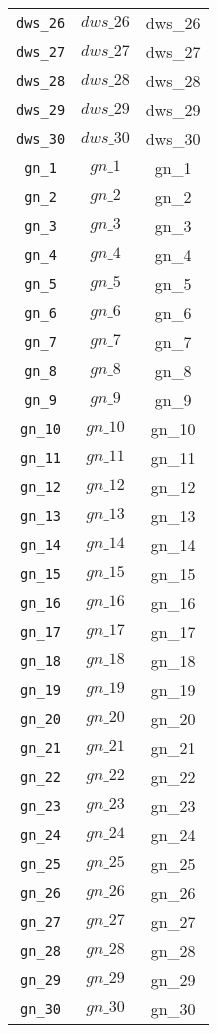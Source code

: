\begin{center}
\begin{longtable}{ccc}
\texttt{dws\_26} & $dws\_26$ & dws\_26\\
\texttt{dws\_27} & $dws\_27$ & dws\_27\\
\texttt{dws\_28} & $dws\_28$ & dws\_28\\
\texttt{dws\_29} & $dws\_29$ & dws\_29\\
\texttt{dws\_30} & $dws\_30$ & dws\_30\\
\texttt{gn\_1} & $gn\_1$ & gn\_1\\
\texttt{gn\_2} & $gn\_2$ & gn\_2\\
\texttt{gn\_3} & $gn\_3$ & gn\_3\\
\texttt{gn\_4} & $gn\_4$ & gn\_4\\
\texttt{gn\_5} & $gn\_5$ & gn\_5\\
\texttt{gn\_6} & $gn\_6$ & gn\_6\\
\texttt{gn\_7} & $gn\_7$ & gn\_7\\
\texttt{gn\_8} & $gn\_8$ & gn\_8\\
\texttt{gn\_9} & $gn\_9$ & gn\_9\\
\texttt{gn\_10} & $gn\_10$ & gn\_10\\
\texttt{gn\_11} & $gn\_11$ & gn\_11\\
\texttt{gn\_12} & $gn\_12$ & gn\_12\\
\texttt{gn\_13} & $gn\_13$ & gn\_13\\
\texttt{gn\_14} & $gn\_14$ & gn\_14\\
\texttt{gn\_15} & $gn\_15$ & gn\_15\\
\texttt{gn\_16} & $gn\_16$ & gn\_16\\
\texttt{gn\_17} & $gn\_17$ & gn\_17\\
\texttt{gn\_18} & $gn\_18$ & gn\_18\\
\texttt{gn\_19} & $gn\_19$ & gn\_19\\
\texttt{gn\_20} & $gn\_20$ & gn\_20\\
\texttt{gn\_21} & $gn\_21$ & gn\_21\\
\texttt{gn\_22} & $gn\_22$ & gn\_22\\
\texttt{gn\_23} & $gn\_23$ & gn\_23\\
\texttt{gn\_24} & $gn\_24$ & gn\_24\\
\texttt{gn\_25} & $gn\_25$ & gn\_25\\
\texttt{gn\_26} & $gn\_26$ & gn\_26\\
\texttt{gn\_27} & $gn\_27$ & gn\_27\\
\texttt{gn\_28} & $gn\_28$ & gn\_28\\
\texttt{gn\_29} & $gn\_29$ & gn\_29\\
\texttt{gn\_30} & $gn\_30$ & gn\_30\\
\hline%
\end{longtable}
\end{center}
